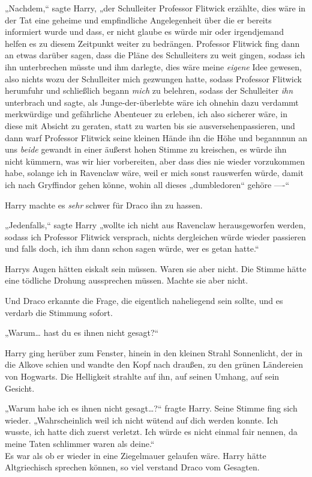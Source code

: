 {„Nachdem,“ sagte Harry, „der Schulleiter Professor Flitwick erzählte, dies wäre in der Tat eine geheime und empfindliche Angelegenheit über die er bereits informiert wurde und dass, er nicht glaube es würde mir oder irgendjemand helfen es zu diesem Zeitpunkt weiter zu bedrängen. Professor Flitwick fing dann an etwas darüber sagen, dass die Pläne des Schulleiters zu weit gingen, sodass ich ihn unterbrechen müsste und ihm darlegte, dies wäre meine \emph{eigene} Idee gewesen, also nichts wozu der Schulleiter mich gezwungen hatte, sodass Professor Flitwick herumfuhr und schließlich begann \emph{mich} zu belehren, sodass der Schulleiter \emph{ihn} unterbrach und sagte, als Junge-der-überlebte wäre ich ohnehin dazu verdammt merkwürdige und gefährliche Abenteuer zu erleben, ich also sicherer wäre, in diese mit Absicht zu geraten, statt zu warten bis sie ausversehenpassieren, und dann warf Professor Flitwick seine kleinen Hände ihn die Höhe und begannnun an uns \emph{beide} gewandt in einer äußerst hohen Stimme zu kreischen, es würde ihn nicht kümmern, was wir hier vorbereiten, aber dass dies nie wieder vorzukommen habe, solange ich in Ravenclaw wäre, weil er mich sonst rauswerfen würde, damit ich nach Gryffindor gehen könne, wohin all dieses „dumbledoren“ gehöre ----“

Harry machte es \emph{sehr} schwer für Draco ihn zu hassen.

„Jedenfalls,“ sagte Harry „wollte ich nicht aus Ravenclaw herausgeworfen werden, sodass ich Professor Flitwick versprach, nichts dergleichen würde wieder passieren und falls doch, ich ihm dann schon sagen würde, wer es getan hatte.“

Harrys Augen hätten eiskalt sein müssen. Waren sie aber nicht. Die Stimme hätte eine tödliche Drohung aussprechen müssen. Machte sie aber nicht.

Und Draco erkannte die Frage, die eigentlich naheliegend sein sollte, und es verdarb die Stimmung sofort.

„Warum… hast du es ihnen nicht gesagt?“

Harry ging herüber zum Fenster, hinein in den kleinen Strahl Sonnenlicht, der in die Alkove schien und wandte den Kopf nach draußen, zu den grünen Ländereien von Hogwarts. Die Helligkeit strahlte auf ihn, auf seinen Umhang, auf sein Gesicht.

„Warum habe ich es ihnen nicht gesagt…?“ fragte Harry. Seine Stimme fing sich wieder. „Wahrscheinlich weil ich nicht wütend auf dich werden konnte. Ich wusste, ich hatte dich zuerst verletzt. Ich würde es nicht einmal fair nennen, da meine Taten schlimmer waren als deine.“\\ Es war als ob er wieder in eine Ziegelmauer gelaufen wäre. Harry hätte Altgriechisch sprechen können, so viel verstand Draco vom Gesagten.

}
